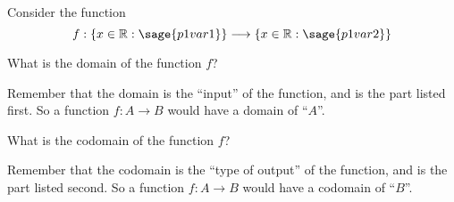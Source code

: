 \documentclass{ximera}
\begin{document}
\begin{problem}
    Consider the function 
    \[
        f:\{ x \in \mathbb{R} : \sage{p1var1} \} \longrightarrow \{ x \in \mathbb{R} : \sage{p1var2} \}
    \]
    
    What is the domain of the function $f$?
    \begin{multipleChoice}
    \end{multipleChoice}
    
    \begin{feedback}
        Remember that the domain is the ``input'' of the function, and is the part listed first. So a function $f:A\rightarrow B$ would have a domain of ``$A$''.
    \end{feedback}    
    What is the codomain of the function $f$?
    
    \begin{multipleChoice}
    \end{multipleChoice}
    
    \begin{feedback}
        Remember that the codomain is the ``type of output'' of the function, and is the part listed second. So a function $f:A\rightarrow B$ would have a codomain of ``$B$''.
    \end{feedback}    
    
\end{problem}
\end{document}

